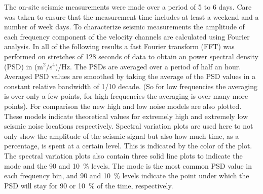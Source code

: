 The on-site seismic measurements were made over a period of 5 to 6 days. Care was taken to ensure that the measurement time includes at least a weekend and a number of week days. To characterize seismic measurements the amplitude of each frequency component of the velocity channels are calculated using Fourier analysis. In all of the following results a fast Fourier transform (FFT) was performed on stretches of 128 seconds of data to obtain an power spectral density (PSD) in (m$^2$/s$^4$)/Hz. The PSDs are averaged over a period of half an hour. Averaged PSD values are smoothed by taking the average of the PSD values in a constant relative bandwidth of 1/10 decade. (So for low frequencies the averaging is over only a few points, for high frequencies the averaging is over many more points). For comparison the new high and low noise models are also plotted. These models indicate theoretical  values for extremely high and extremely low seismic noise locations respectively. Spectral variation plots are used here to not only show the amplitude of the seismic signal but also how much time, as a percentage, is spent at a certain level. This is indicated by the color of the plot. The spectral variation plots also contain three solid line plots to indicate the mode and the 90 and 10~\% levels. The mode is the most common PSD value in each frequency bin, and 90 and 10~\% levels indicate the point under which the PSD will stay for 90 or 10~\% of the time, respectively. 